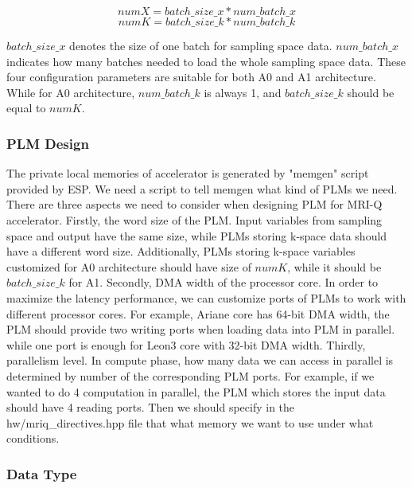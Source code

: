     $$numX = batch\_size\_x * num\_batch\_x$$
    $$numK = batch\_size\_k * num\_batch\_k$$

$batch\_size\_x$ denotes the size of one batch for sampling space
data. $num\_batch\_x$ indicates how many batches needed to load the whole
sampling space data. These four configuration parameters are suitable for both
A0 and A1 architecture. While for A0 architecture, $num\_batch\_k$ is always 1,
and $batch\_size\_k$ should be equal to $numK$.\\

\subsubsection{PLM Design}

The private local memories of accelerator is generated by "memgen" script
provided by ESP. We need a script to tell memgen what kind of PLMs we
need. There are three aspects we need to consider when designing PLM for MRI-Q
accelerator. Firstly, the word size of the PLM. Input variables from sampling
space and output have the same size, while PLMs storing k-space data should have
a different word size. Additionally, PLMs storing k-space variables customized
for A0 architecture should have size of $numK$, while it should be
$batch\_size\_k$ for A1. Secondly, DMA width of the processor core. In order to
maximize the latency performance, we can customize ports of PLMs to work with
different processor cores. For example, Ariane core has 64-bit DMA width, the
PLM should provide two writing ports when loading data into PLM in
parallel. while one port is enough for Leon3 core with 32-bit DMA
width. Thirdly, parallelism level. In compute phase, how many data we can access
in parallel is determined by number of the corresponding PLM ports. For example,
if we wanted to do 4 computation in parallel, the PLM which stores the input
data should have 4 reading ports. Then we should specify in the
hw/mriq\_directives.hpp file that what memory we want to use under what
conditions.


\subsubsection{Data Type}

